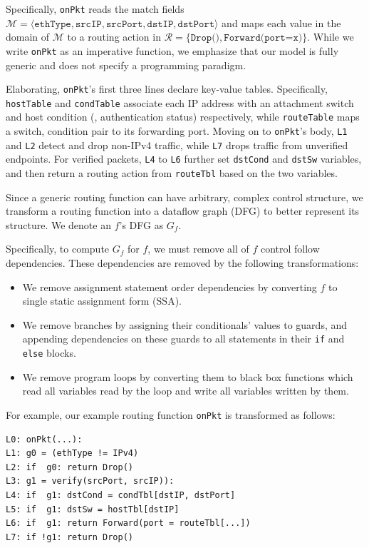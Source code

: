 Specifically, \texttt{onPkt} reads the match fields $\mathcal{M} = \langle \texttt{ethType}, \texttt{srcIP}, \texttt{srcPort}, \texttt{dstIP}, \texttt{dstPort} \rangle$ and maps each value in the domain of $\mathcal{M}$ to a routing action in $\mathcal{R}=\{\texttt{Drop()}, \texttt{Forward(port=x)} \}$. While we write \texttt{onPkt} as an imperative function, we emphasize that our model is fully generic and does not specify a programming paradigm.

Elaborating, \texttt{onPkt}'s first three lines declare key-value tables. Specifically, \texttt{hostTable} and \texttt{condTable} associate each IP address with an attachment switch and host condition (\eg, authentication status) respectively, while \texttt{routeTable} maps a switch, condition pair to its forwarding port. Moving on to \texttt{onPkt}'s body, \texttt{L1} and \texttt{L2} detect and drop non-IPv4 traffic, while \texttt{L7} drops traffic from unverified endpoints. For verified packets, \texttt{L4} to \texttt{L6} further set \texttt{dstCond} and \texttt{dstSw} variables, and then return a routing action  from \texttt{routeTbl} based on the two variables.


 Since a generic routing function can have arbitrary, complex control structure, we transform a routing function into a dataflow graph (DFG) to better represent its structure. We denote an $f$'s DFG as $G_f$.

Specifically, to compute $G_f$ for $f$, we must remove all of $f$ control follow dependencies. These dependencies are removed by the following transformations:
\begin{itemize}
  \item We remove assignment statement order dependencies by converting $f$ to single static assignment form (SSA).
  \item We remove branches by assigning their conditionals' values to guards, and appending dependencies on these guards to all statements in their \texttt{if} and \texttt{else} blocks.
  \item We remove program loops by converting them to black box functions which read all variables read by the loop and write all variables written by them.
\end{itemize}

For example, our example routing function \texttt{onPkt} is transformed as follows:

\begin{verbatim}
L0: onPkt(...):
L1: g0 = (ethType != IPv4)
L2: if  g0: return Drop()
L3: g1 = verify(srcPort, srcIP)):
L4: if  g1: dstCond = condTbl[dstIP, dstPort]
L5: if  g1: dstSw = hostTbl[dstIP]
L6: if  g1: return Forward(port = routeTbl[...])
L7: if !g1: return Drop()
\end{verbatim}


